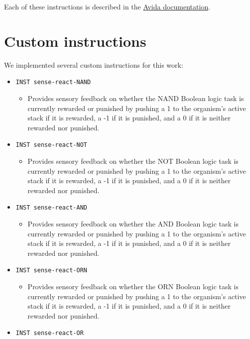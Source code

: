 \documentclass[]{book}
\providecommand{\tightlist}{%
  \setlength{\itemsep}{0pt}\setlength{\parskip}{0pt}}
\begin{document}
Each of these instructions is described in the \href{https://github.com/devosoft/avida/wiki/Instruction-Set}{Avida documentation}.

\hypertarget{custom-instructions}{%
\section{Custom instructions}\label{custom-instructions}}

We implemented several custom instructions for this work:

\begin{itemize}
\tightlist
\item
  \texttt{INST\ sense-react-NAND}

  \begin{itemize}
  \tightlist
  \item
    Provides sensory feedback on whether the NAND Boolean logic task is currently rewarded or punished by pushing a 1 to the organism's active stack if it is rewarded, a -1 if it is punished, and a 0 if it is neither rewarded nor punished.
  \end{itemize}
\item
  \texttt{INST\ sense-react-NOT}

  \begin{itemize}
  \tightlist
  \item
    Provides sensory feedback on whether the NOT Boolean logic task is currently rewarded or punished by pushing a 1 to the organism's active stack if it is rewarded, a -1 if it is punished, and a 0 if it is neither rewarded nor punished.
  \end{itemize}
\item
  \texttt{INST\ sense-react-AND}

  \begin{itemize}
  \tightlist
  \item
    Provides sensory feedback on whether the AND Boolean logic task is currently rewarded or punished by pushing a 1 to the organism's active stack if it is rewarded, a -1 if it is punished, and a 0 if it is neither rewarded nor punished.
  \end{itemize}
\item
  \texttt{INST\ sense-react-ORN}

  \begin{itemize}
  \tightlist
  \item
    Provides sensory feedback on whether the ORN Boolean logic task is currently rewarded or punished by pushing a 1 to the organism's active stack if it is rewarded, a -1 if it is punished, and a 0 if it is neither rewarded nor punished.
  \end{itemize}
\item
  \texttt{INST\ sense-react-OR}


\end{itemize}
\end{document}
